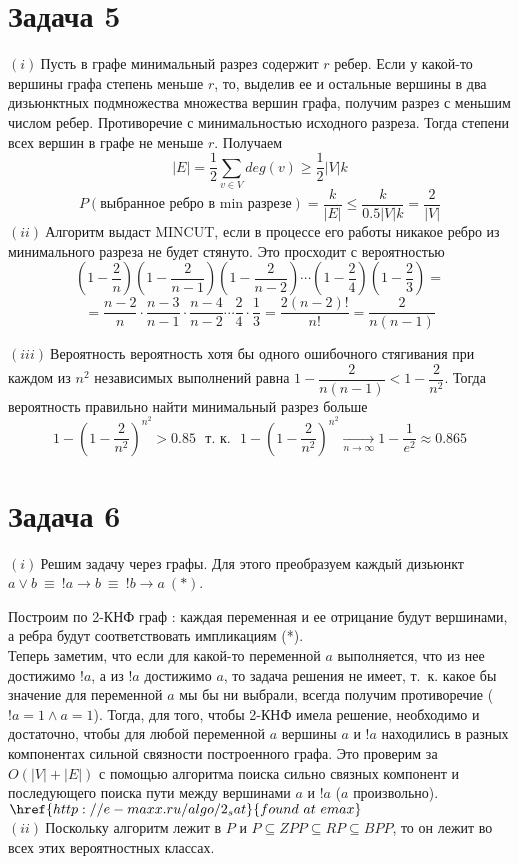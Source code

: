 \documentclass[a4paper,12pt]{article} %
\begin{document}
\section*{Задача 5}
$(i)~$Пусть в графе минимальный разрез содержит $r$ ребер. Если у какой-то вершины графа степень меньше $r$, то, выделив ее и остальные вершины в два дизьюнктных подмножества множества вершин графа, получим разрез с меньшим числом ребер. Противоречие с минимальностью исходного разреза. Тогда степени всех вершин в графе не меньше $r$. Получаем \[
|E| = \dfrac{1}{2}\sum_{v \in V}{deg(v)} \geq \dfrac{1}{2}|V|k
\]
\[
P(\text{выбранное ребро в min разрезе}) = \dfrac{k}{|E|} \leq \dfrac{k}{0.5|V|k} = \dfrac{2}{|V|}
\]
$(ii)~$Алгоритм выдаст MINCUT, если в процессе его работы никакое ребро из минимального разреза не будет стянуто. Это просходит с вероятностью
\[
\left(1 - \dfrac{2}{n}\right)\left(1 - \dfrac{2}{n-1}\right)\left(1 - \dfrac{2}{n-2}\right)\cdots \left(1 - \dfrac{2}{4}\right)\left(1 - \dfrac{2}{3}\right) = \]
\[=\dfrac{n-2}{n}\cdot\dfrac{n-3}{n-1}\cdot\dfrac{n-4}{n-2}\cdots\dfrac{2}{4}\cdot\dfrac{1}{3}=\dfrac{2(n-2)!}{n!}=\dfrac{2}{n(n-1)}
\]

$(iii)~$Вероятность вероятность хотя бы одного ошибочного стягивания при каждом из $n^2$ независимых выполнений равна $1-\dfrac{2}{n(n-1)} < 1 - \dfrac{2}{n^2}$. Тогда вероятность правильно найти минимальный разрез больше 
\[
1 - \left(1-\dfrac{2}{n^2}\right)^{n^2} > 0.85 \text{~~т.~к.~~} 1 - \left(1-\dfrac{2}{n^2}\right)^{n^2} \underset{ n\rightarrow \infty}{\rightarrow}1-\dfrac{1}{e^2}\approx 0.865
\] 

\section*{Задача 6}
$(i)~$Решим задачу через графы. Для этого преобразуем каждый дизьюнкт $a\vee b~\equiv~!a\rightarrow b~\equiv~!b\rightarrow a~(*)$.

Построим по 2-КНФ граф : каждая переменная и ее отрицание будут вершинами, а ребра будут соответствовать импликациям (*).\\
Теперь заметим, что если для какой-то переменной $a$ выполняется, что из нее достижимо $!a$, а из $!a$ достижимо $a$, то задача решения не имеет, т.~к. какое бы значение для переменной $a$ мы бы ни выбрали, всегда получим противоречие ($!a=1\wedge a=1$). Тогда, для того, чтобы 2-КНФ имела решение, необходимо и достаточно, чтобы для любой переменной $a$ вершины $a$ и $!a$ находились в разных компонентах сильной связности построенного графа. Это проверим за $O(|V|+|E|)$ с помощью алгоритма поиска сильно связных компонент и последующего поиска пути между вершинами $a$ и $!a$ ($a$ произвольно).
$\href{http://e-maxx.ru/algo/2_sat}{found~at~emax}$\\
$(ii)~$Поскольку алгоритм лежит в $P$ и $P \subseteq ZPP \subseteq RP \subseteq BPP$, то он лежит во всех этих вероятностных классах.\\
\end{document}
